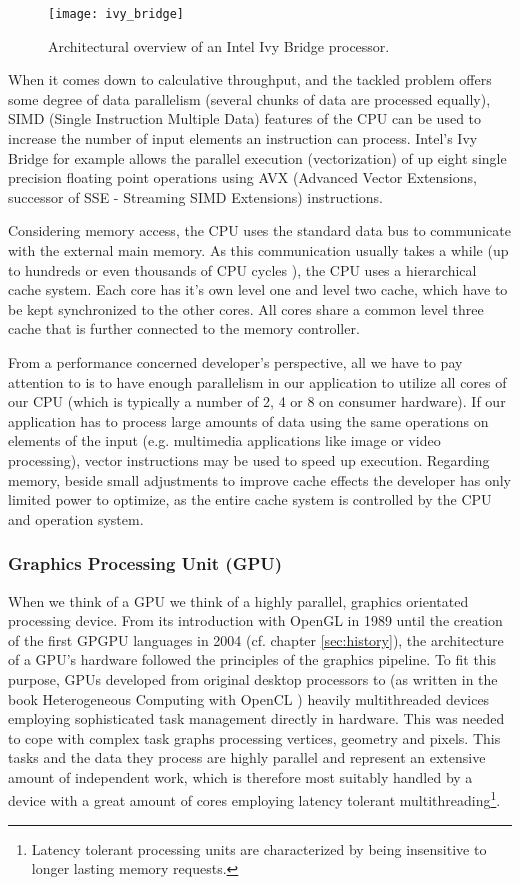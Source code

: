 \begin{figure}
\centering
\texttt{[image: ivy\_bridge]}
\caption{Architectural overview of an Intel Ivy Bridge processor. \cite{ivy_bridge}}
\label{fig:ivy_bridge}
\end{figure}

When it comes down to calculative throughput, and the tackled problem offers some degree of data parallelism (several chunks of data are processed equally), SIMD (Single Instruction Multiple Data) features of the CPU can be used to increase the number of input elements an instruction can process. Intel's Ivy Bridge for example allows the parallel execution (vectorization) of up eight single precision floating point operations using AVX (Advanced Vector Extensions, successor of SSE - Streaming SIMD Extensions) instructions.

Considering memory access, the CPU uses the standard data bus to communicate with the external main memory. As this communication usually takes a while (up to hundreds or even thousands of CPU cycles \cite[p.54]{opencl_book}), the CPU uses a hierarchical cache system. Each core has it's own level one and level two cache, which have to be kept synchronized to the other cores. All cores share a common level three cache that is further connected to the memory controller.

From a performance concerned developer's perspective, all we have to pay attention to is to have enough parallelism in our application to utilize all cores of our CPU (which is typically a number of 2, 4 or 8 on consumer hardware). If our application has to process large amounts of data using the same operations on elements of the input (e.g. multimedia applications like image or video processing), vector instructions may be used to speed up execution. Regarding memory, beside small adjustments to improve cache effects the developer has only limited power to optimize, as the entire cache system is controlled by the CPU and operation system. 


\subsubsection{Graphics Processing Unit (GPU)}
\label{sec:gpu}

When we think of a GPU we think of a highly parallel, graphics orientated processing device. From its introduction with OpenGL in 1989 until the creation of the first GPGPU languages in 2004 (cf. chapter \ref{sec:history}), the architecture of a GPU's hardware followed the principles of the graphics pipeline. To fit this purpose, GPUs developed from original desktop processors to (as written in the book Heterogeneous Computing with OpenCL \cite{opencl_book}) heavily multithreaded devices employing sophisticated task management directly in hardware. This was needed to cope with complex task graphs processing vertices, geometry and pixels. This tasks and the data they process are highly parallel and represent an extensive amount of independent work, which is therefore most suitably handled by a device with a great amount of cores employing latency tolerant multithreading\footnote{Latency tolerant processing units are characterized by being insensitive to longer lasting memory requests.}.


